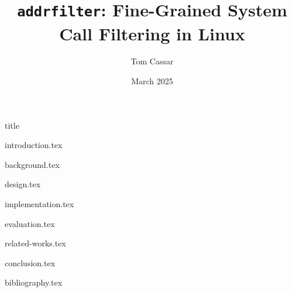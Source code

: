 \documentclass[fontsize=14pt]{article}
\title{\texttt{addrfilter}: Fine-Grained System Call Filtering in Linux}
\author{Tom Cassar}
\date{March 2025}
\begin{document}
{title}

\clearpage

{introduction.tex}

\clearpage

{background.tex}

\clearpage

{design.tex}

\clearpage

{implementation.tex}

\clearpage

{evaluation.tex}

\clearpage

{related-works.tex}

\clearpage

{conclusion.tex}

\clearpage

{bibliography.tex}
\end{document}
